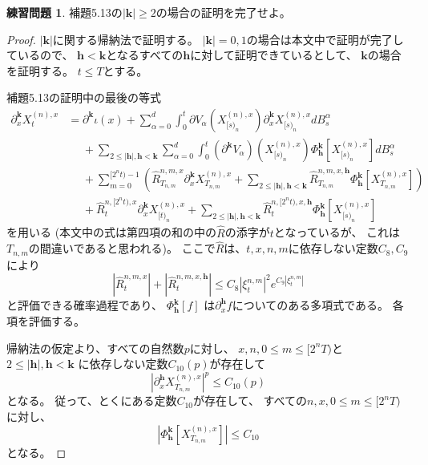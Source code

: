 \documentclass[uplatex]{jsarticle}
\theoremstyle{definition}
\newtheorem{prob}[prob]{練習問題}
\begin{document}
\begin{prob}\label{prob: 5.5}
  補題5.13の\(|\mathbf{k}| \geq 2\)の場合の証明を完了せよ。
\end{prob}

\begin{proof}
  \(|\mathbf{k}|\)に関する帰納法で証明する。
  \(|\mathbf{k}| = 0,1\)の場合は本文中で証明が完了しているので、
  \(\mathbf{h}<\mathbf{k}\)となるすべての\(\mathbf{h}\)に対して証明できているとして、
  \(\mathbf{k}\)の場合を証明する。
  \(t \leq T\)とする。

  補題5.13の証明中の最後の等式
  \begin{align*}
    \partial^{\mathbf{k}}_x X_t^{(n),x}
    &= \partial^\mathbf{k}\iota(x)
    + \sum_{\alpha=0}^d \int_0^t\partial V_\alpha\left(X_{[s)_n}^{(n),x}\right)
    \partial_x^{\mathbf{k}}X_{[s)_n}^{(n),x} dB_s^\alpha \\
    &\ \ \ \ \ \
    + \sum_{2\leq |\mathbf{h}| , \mathbf{h} < \mathbf{k}}\sum_{\alpha=0}^d
    \int_0^t \left( \partial^{\mathbf{k}} V_\alpha \right)
    \left( X_{[s)_n}^{(n),x}\right)
    \Phi_{\mathbf{h}}^{\mathbf{k}}\left[ X_{[s)_n}^{(n),x}\right] dB_s^\alpha \\
    &\ \ \ \ \ \
    + \sum_{m=0}^{[2^nt)-1}\left(
    \hat{R}_{T_{n,m}}^{n,m,x}\partial_x^{\mathbf{k}}X_{T_{n,m}}^{(n),x}
    + \sum_{2 \leq |\mathbf{h}| , \mathbf{h} < \mathbf{k}}
    \hat{R}_{T_{n,m}}^{n,m,x,\mathbf{h}}
    \Phi_{\mathbf{h}}^{\mathbf{k}}\left[ X_{T_{n,m}}^{(n),x}\right]\right) \\
    &\ \ \ \ \ \
    + \hat{R}_t^{n,[2^nt),x}\partial_x^{\mathbf{k}}X_{[t)_n}^{(n),x}
    + \sum_{2 \leq |\mathbf{h}| , \mathbf{h} < \mathbf{k}}
    \hat{R}_t^{n,[2^nt),x,\mathbf{h}}
    \Phi_{\mathbf{h}}^{\mathbf{k}}\left[ X_{[s)_n}^{(n),x}\right]
  \end{align*}
  を用いる
  (本文中の式は第四項の和の中の\(\hat{R}\)の添字が\(t\)となっているが、
  これは\(T_{n,m}\)の間違いであると思われる)。
  ここで\(\hat{R}\)は、\(t,x,n,m\)に依存しない定数\(C_8,C_9\)により
  \begin{equation}\label{eq: 5.5}
    |\hat{R}_t^{n,m,x}| + |\hat{R}_t^{n,m,x,\mathbf{h}}| \leq
    C_8|\xi_t^{n,m}|^2e^{C_9|\xi_t^{n,m}|}
    \tag{\(\dagger\)}
  \end{equation}
  と評価できる確率過程であり、
  \(\Phi_{\mathbf{h}}^{\mathbf{k}}\left[ f\right]\)
  は\(\partial_x^{\mathbf{h}}f\)についてのある多項式である。
  各項を評価する。

  帰納法の仮定より、すべての自然数\(p\)に対し、
  \(x,n,0\leq m \leq [2^nT)\)と
  \(2 \leq |\mathbf{h}| , \mathbf{h} < \mathbf{k}\)
  に依存しない定数\(C_{10}(p)\)が存在して
  \[
  |\partial_x^{\mathbf{h}}X_{T_{n,m}}^{(n),x}|^p \leq C_{10}(p)
  \]
  となる。
  従って、とくにある定数\(C_{10}\)が存在して、
  すべての\(n,x,0\leq m \leq [2^nT)\)に対し、
  \[
  \left| \Phi_{\mathbf{h}}^{\mathbf{k}}\left[ X_{T_{n,m}}^{(n),x}\right]\right|
  \leq C_{10}
  \]
  となる。


\end{proof}
\end{document}
